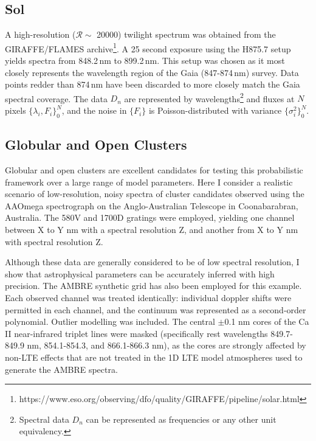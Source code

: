 \documentclass{aastex}
\begin{document}
\subsection{Sol}
A high-resolution ($\mathcal{R} \sim$ 20000) twilight spectrum was obtained from the GIRAFFE/FLAMES archive\footnote{https://www.eso.org/observing/dfo/quality/GIRAFFE/pipeline/solar.html}. A 25 second exposure using the H875.7 setup yields spectra from 848.2\,nm to 899.2\,nm. This setup was chosen as it most closely represents the wavelength region of the Gaia (847-874\,nm) survey. Data points redder than 874\,nm have been discarded to more closely match the Gaia spectral coverage. The data $D_n$ are represented by wavelengths\footnote{Spectral data $D_n$ can be represented as frequencies or any other unit equivalency.} and fluxes at $N$ pixels $\{\lambda_i,F_i\}_{0}^{N}$, and the noise in $\{F_i\}$ is Poisson-distributed with variance $\{\sigma_{i}^{2}\}_{0}^{N}$. 



 


\subsection{Globular and Open Clusters}
Globular and open clusters are excellent candidates for testing this probabilistic framework over a large range of model parameters. Here I consider a realistic scenario of low-resolution, noisy spectra of cluster candidates observed using the AAOmega spectrograph on the Anglo-Australian Telescope in Coonabarabran, Australia. The 580V and 1700D gratings were employed, yielding one channel between X to Y nm with a spectral resolution Z, and another from X to Y nm with spectral resolution Z.

Although these data are generally considered to be of low spectral resolution, I show that astrophysical parameters can be accurately inferred with high precision. The AMBRE synthetic grid has also been employed for this example. Each observed channel was treated identically: individual doppler shifts were permitted in each channel, and the continuum was represented as a second-order polynomial. Outlier modelling was included. The central $\pm$0.1 nm cores of the Ca II near-infrared triplet lines were masked (specifically rest wavelengths 849.7-849.9 nm, 854.1-854.3, and 866.1-866.3 nm), as the cores are strongly affected by non-LTE effects that are not treated in the 1D LTE model atmospheres used to generate the AMBRE spectra. 
\end{document}
